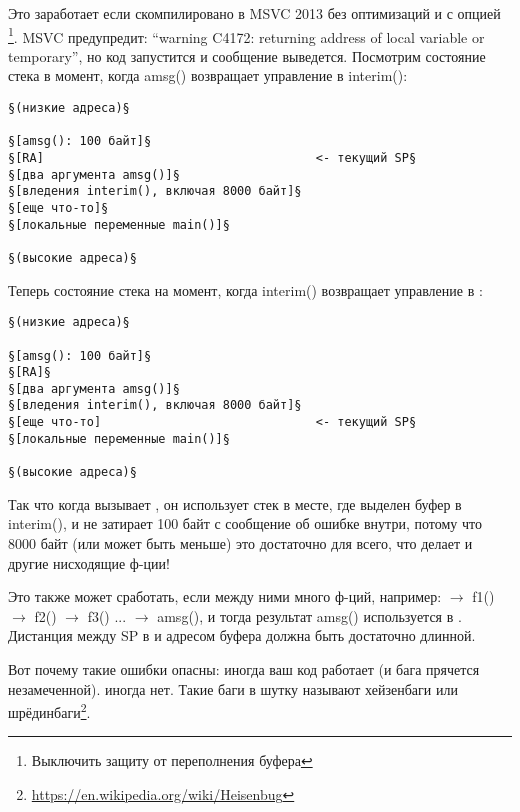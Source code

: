 Это заработает если скомпилировано в MSVC 2013 без оптимизаций и с опцией \footnote{Выключить защиту от переполнения буфера}.
MSVC предупредит: ``warning C4172: returning address of local variable or temporary'', но код запустится и сообщение выведется.
Посмотрим состояние стека в момент, когда amsg() возвращает управление в interim():

\begin{lstlisting}
§(низкие адреса)§

§[amsg(): 100 байт]§
§[RA]                                      <- текущий SP§
§[два аргумента amsg()]§
§[вледения interim(), включая 8000 байт]§
§[еще что-то]§
§[локальные переменные main()]§

§(высокие адреса)§
\end{lstlisting}

Теперь состояние стека на момент, когда interim() возвращает управление в \main{}:

\begin{lstlisting}
§(низкие адреса)§

§[amsg(): 100 байт]§
§[RA]§
§[два аргумента amsg()]§
§[вледения interim(), включая 8000 байт]§
§[еще что-то]                              <- текущий SP§
§[локальные переменные main()]§

§(высокие адреса)§
\end{lstlisting}

Так что когда \main вызывает \printf, он использует стек в месте, где выделен буфер в interim(),
и не затирает 100 байт с сообщение об ошибке внутри, потому что 8000 байт (или может быть меньше) это достаточно для всего,
что делает \printf и другие нисходящие ф-ции!

Это также может сработать, если между ними много ф-ций, например:
\main $\rightarrow$ f1() $\rightarrow$ f2() $\rightarrow$ f3() ... $\rightarrow$ amsg(),
и тогда результат amsg() используется в \main.
Дистанция между \ac{SP} в \main и адресом буфера  должна быть достаточно длинной.

Вот почему такие ошибки опасны: иногда ваш код работает (и бага прячется незамеченной). иногда нет.
\label{heisenbug}
Такие баги в шутку называют хейзенбаги или шрёдинбаги\footnote{\url{https://en.wikipedia.org/wiki/Heisenbug}}.

